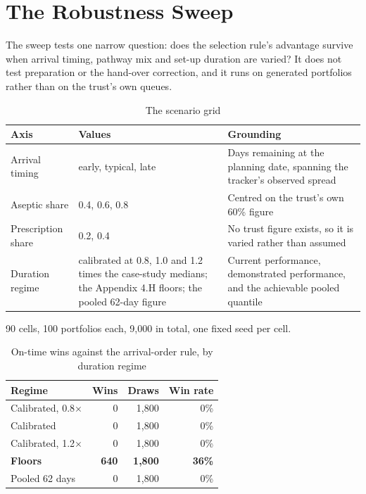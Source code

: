 
\chapter{The Robustness Sweep}
\label{app:sweep}

The sweep tests one narrow question: does the selection rule's advantage survive when arrival timing, pathway mix and set-up duration are varied? It does not test preparation or the hand-over correction, and it runs on generated portfolios rather than on the trust's own queues.

\begin{table}[htbp]
  \centering
  \caption{The scenario grid}
  \label{tab:grid}
  \begin{tabularx}{\textwidth}{@{}P{2.9cm}P{4.4cm}L@{}}
    \toprule
    \textbf{Axis} & \textbf{Values} & \textbf{Grounding} \\
    \midrule
    Arrival timing & early, typical, late &
      Days remaining at the planning date, spanning the tracker's observed spread \\
    \addlinespace
    Aseptic share & 0.4, 0.6, 0.8 &
      Centred on the trust's own 60\% figure \\
    \addlinespace
    Prescription share & 0.2, 0.4 &
      No trust figure exists, so it is varied rather than assumed \\
    \addlinespace
    Duration regime &
      calibrated at 0.8, 1.0 and 1.2 times the case-study medians; the
      Appendix 4.H floors; the pooled 62-day figure &
      Current performance, demonstrated performance, and the achievable pooled
      quantile \\
    \bottomrule
  \end{tabularx}
\end{table}

90 cells, 100 portfolios each, 9,000 in total, one fixed seed per cell.

\begin{table}[htbp]
  \centering
  \caption{On-time wins against the arrival-order rule, by duration regime}
  \label{tab:sweepwins}
  \begin{tabular}{@{}lrrr@{}}
    \toprule
    \textbf{Regime} & \textbf{Wins} & \textbf{Draws} & \textbf{Win rate} \\
    \midrule
    Calibrated, 0.8$\times$ & 0 & 1,800 & 0\% \\
    Calibrated             & 0 & 1,800 & 0\% \\
    Calibrated, 1.2$\times$ & 0 & 1,800 & 0\% \\
    \textbf{Floors}        & \textbf{640} & \textbf{1,800} & \textbf{36\%} \\
    Pooled 62 days         & 0 & 1,800 & 0\% \\
    \bottomrule
  \end{tabular}
\end{table}

